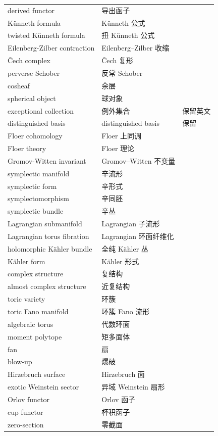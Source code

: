 {\begin{longtable}{p{5.0cm}p{5.6cm}p{3.6cm}}
derived functor & 导出函子 &  \\
Künneth formula & Künneth 公式 &  \\
twisted Künneth formula & 扭 Künneth 公式 &  \\
Eilenberg-Zilber contraction & Eilenberg–Zilber 收缩 &  \\
Čech complex & Čech 复形 &  \\
perverse Schober & 反常 Schober &  \\
cosheaf & 余层 &  \\
spherical object & 球对象 &  \\
exceptional collection & 例外集合 & 保留英文 \\
distinguished basis & distinguished basis & 保留 \\
Floer cohomology & Floer 上同调 &  \\
Floer theory & Floer 理论 &  \\
Gromov-Witten invariant & Gromov–Witten 不变量 &  \\
symplectic manifold & 辛流形 &  \\
symplectic form & 辛形式 &  \\
symplectomorphism & 辛同胚 &  \\
symplectic bundle & 辛丛 &  \\
Lagrangian submanifold & Lagrangian 子流形 &  \\
Lagrangian torus fibration & Lagrangian 环面纤维化 &  \\
holomorphic Kähler bundle & 全纯 Kähler 丛 &  \\
Kähler form & Kähler 形式 &  \\
complex structure & 复结构 &  \\
almost complex structure & 近复结构 &  \\
toric variety & 环簇 &  \\
toric Fano manifold & 环簇 Fano 流形 &  \\
algebraic torus & 代数环面 &  \\
moment polytope & 矩多面体 &  \\
fan & 扇 &  \\
blow-up & 爆破 &  \\
Hirzebruch surface & Hirzebruch 面 &  \\
exotic Weinstein sector & 异域 Weinstein 扇形 &  \\
Orlov functor & Orlov 函子 &  \\
cup functor & 杯积函子 &  \\
zero-section & 零截面 &  \\

\end{longtable}}
